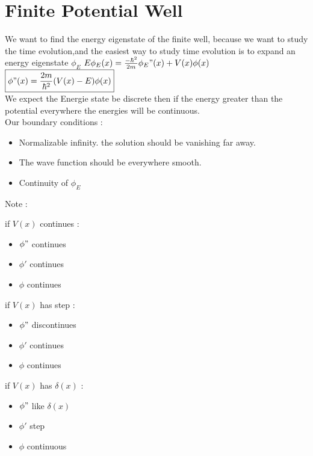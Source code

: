 \documentclass[12pt,oneside]{book}
\begin{document}
\section{Finite Potential Well}
	We want to find the energy eigenstate of the finite well, because we want to study the time evolution,and the easiest way to study time evolution is to expand an energy eigenstate $\phi_E$
	$E\phi_E(x) = \frac{-\hbar^2}{2m}\phi_E"(x)+V(x)\phi(x) $\\
	$\boxed{\phi"(x) = \frac{2m}{\hbar^2}(V(x)-  E)\phi(x)}$\\
	We expect the Energie state be discrete  then if the energy greater than the potential everywhere the energies will be continuous.\\
	Our boundary conditions : 
	\begin{itemize}
		\item Normalizable infinity. the solution should be vanishing far away.
		\item The wave function should be everywhere smooth.
		\item Continuity of $\phi_E$ 
	\end{itemize}
	Note : \\ 
	\begin{center}
		\begin{minipage}{0.32\linewidth}
			if $V(x)$ continues : 
		\begin{itemize}
			\item $\phi"$ continues
			\item $\phi'$ continues
			\item $\phi$ continues
		\end{itemize}
		\end{minipage}
		\begin{minipage}{0.32\linewidth}
			if $V(x)$ has step :
		\begin{itemize}
			\item $\phi"$ discontinues
			\item $\phi'$ continues
			\item $\phi$ continues
		\end{itemize}
		\end{minipage}
		\begin{minipage}{0.32\linewidth}
			if $V(x)$ has $\delta(x)$ :
			\begin{itemize}
				\item  $\phi"$ like $\delta(x)$
				\item $\phi'$ step 
				\item $\phi$ continuous
			\end{itemize}
		\end{minipage}
	\end{center}
\end{document}
